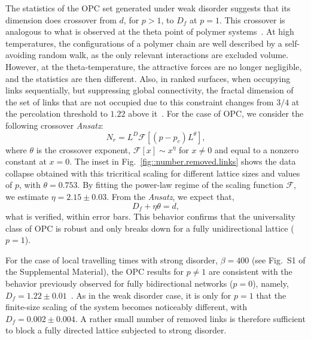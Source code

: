 \documentclass[aps,prl,twocolumn,showpacs,
superscriptaddress,floatfix, 10pt]{revtex4-1}
\begin{document}
The statistics of the OPC set generated under weak disorder suggests that its
dimension does crossover from $d$, for $p>1$, to $D_f$ at $p=1$. This crossover
is analogous to what is observed at the theta point of polymer
systems~\cite{deGennes1979,Chang1991,Poole1989}. At high temperatures, the
configurations of a polymer chain are well described by a self-avoiding random
walk, as the only relevant interactions are excluded volume. However, at the
theta-temperature, the attractive forces are no longer negligible, and the
statistics are then different. Also, in ranked surfaces, when occupying links
sequentially, but suppressing global connectivity, the fractal dimension of the
set of links that are not occupied due to this constraint changes from $3/4$ at
the percolation threshold to $1.22$ above it~\cite{Schrenk2012}. For the case of
OPC, we consider the following crossover \textit{Ansatz}:
%
\begin{equation}
	\label{eq::ansatz}
	N_r=L^D\mathcal{F}\left[\left(p-p_c\right)L^\theta\right],
\end{equation} 
%
where $\theta$ is the crossover exponent, $\mathcal{F}\left[x\right]\sim
x^{\eta}$ for $x\neq0$ and equal to a nonzero constant at $x=0$. The inset
in Fig.~\ref{fig::number.removed.links} shows the data collapse obtained
with this tricritical scaling for different lattice sizes and values of
$p$, with $\theta=0.753$. By fitting the power-law regime of the scaling
function $\mathcal{F}$, we estimate $\eta=2.15\pm0.03$. From the
\textit{Ansatz}, we expect that, 
%
\begin{equation}\label{eq::exponents} %
	D_f+\eta\theta=d, %
\end{equation} 
%
what is verified, within error bars. This behavior confirms that the
universality class of OPC is robust and only breaks down for a fully
unidirectional lattice ($p=1$).
	
For the case of local travelling times with strong disorder, $\beta=400$
(see Fig.~S1 of the Supplemental Material), the
OPC results for $p\neq 1$ are consistent with the behavior previously
observed for fully bidirectional networks ($p=0$), namely, $D_{f}=1.22\pm
0.01$~\cite{Andrade2009}. As in the weak disorder case, it is only for
$p=1$ that the finite-size scaling of the system becomes noticeably
different, with $D_f=0.002\pm 0.004$. A rather small number of removed links
is therefore sufficient to block a fully directed lattice subjected to
strong disorder.
     
\end{document}
